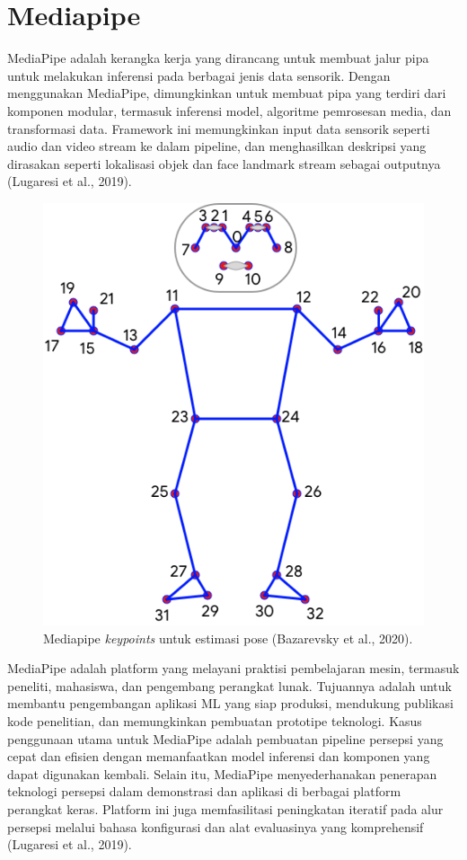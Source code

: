 \section{Mediapipe}
\label{sec:mediapipe}

MediaPipe adalah kerangka kerja yang dirancang untuk membuat jalur pipa untuk melakukan inferensi pada berbagai jenis data sensorik. Dengan menggunakan MediaPipe, dimungkinkan untuk membuat pipa yang terdiri dari komponen modular, termasuk inferensi model, algoritme pemrosesan media, dan transformasi data. Framework ini memungkinkan input data sensorik seperti audio dan video stream ke dalam pipeline, dan menghasilkan deskripsi yang dirasakan seperti lokalisasi objek dan face landmark stream sebagai outputnya (Lugaresi et al., 2019).

\begin{figure}[H]
  \centering
  \includegraphics[scale=1.3]{gambar/mediapipeb2.png}
  \caption{Mediapipe \emph{keypoints} untuk estimasi pose (Bazarevsky et al., 2020).}
  \label{fig:mediapipe}
\end{figure}

MediaPipe adalah platform yang melayani praktisi pembelajaran mesin, termasuk peneliti, mahasiswa, dan pengembang perangkat lunak. Tujuannya adalah untuk membantu pengembangan aplikasi ML yang siap produksi, mendukung publikasi kode penelitian, dan memungkinkan pembuatan prototipe teknologi. Kasus penggunaan utama untuk MediaPipe adalah pembuatan pipeline persepsi yang cepat dan efisien dengan memanfaatkan model inferensi dan komponen yang dapat digunakan kembali. Selain itu, MediaPipe menyederhanakan penerapan teknologi persepsi dalam demonstrasi dan aplikasi di berbagai platform perangkat keras. Platform ini juga memfasilitasi peningkatan iteratif pada alur persepsi melalui bahasa konfigurasi dan alat evaluasinya yang komprehensif (Lugaresi et al., 2019).

